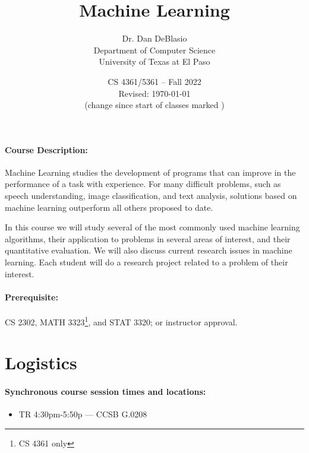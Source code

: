 \documentclass[12pt]{scrartcl}
\title{Machine Learning}\let\Title\@title
\subtitle{
{\small
Dr. Dan DeBlasio\\
Department of Computer Science\\
University of Texas at El Paso\\
}
\vskip-1cm}
\date{\small CS 4361/5361 -- Fall 2022\\ \vspace{1em}Revised: \today\\(change since start of classes marked \change{}{in orange})}
\begin{document}

\maketitle
%
%
\paragraph{Course Description:} Machine Learning studies the development of programs that can improve in the performance of a task with experience. 
For many difficult problems, such as speech understanding, image classification, and text analysis, solutions based on machine learning outperform all others proposed to date. 

In this course we will study several of the most commonly used machine learning algorithms, their application to problems in several areas of interest, and their quantitative evaluation. 
We will also discuss current research issues in machine learning. 
Each student will do a research project related to a problem of their interest.

\paragraph{Prerequisite:} CS 2302, MATH 3323\footnote{CS 4361 only}, and STAT 3320\footnotemark[1]; or instructor approval.

\clearpage
\tableofcontents

\section{Logistics}
\paragraph{Synchronous course session times and locations:}
\begin{itemize}
\item TR 4:30pm-5:50p --- CCSB G.0208
\end{itemize}
\end{document}
